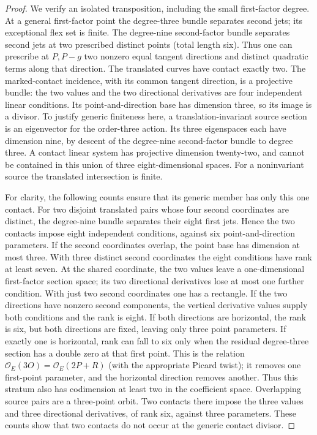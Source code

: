 \begin{proof}
We verify an isolated transposition, including the small
first-factor degree. At a general first-factor point the
degree-three bundle separates second jets; its exceptional
flex set is finite. The degree-nine second-factor bundle
separates second jets at two prescribed distinct points
(total length six). Thus one can prescribe at $P,P-g$
two nonzero equal tangent directions and distinct quadratic
terms along that direction. The translated curves have
contact exactly two. The marked-contact incidence, with its
common tangent direction, is a projective bundle: the two
values and the two directional derivatives are four
independent linear conditions. Its point-and-direction base
has dimension three, so its image is a divisor. To justify
generic finiteness here, a translation-invariant source section
is an eigenvector for the order-three action. Its three
eigenspaces each have dimension nine, by descent of the
degree-nine second-factor bundle to degree three. A contact
linear system has projective dimension twenty-two, and cannot
be contained in this union of three eight-dimensional spaces.
For a noninvariant source the translated intersection is finite.

For clarity, the following counts ensure that its generic
member has only this one contact. For two disjoint translated
pairs whose four second coordinates are distinct, the
degree-nine bundle separates their eight first jets. Hence
the two contacts impose eight independent conditions, against
six point-and-direction parameters. If the second coordinates
overlap, the point base has dimension at most three. With three
distinct second coordinates the eight conditions have rank
at least seven. At the shared coordinate, the two values
leave a one-dimensional first-factor section space; its two
directional derivatives lose at most one further condition.
With just two second coordinates one has a rectangle. If the
two directions have nonzero second components, the vertical
derivative values supply both conditions and the rank is eight.
If both directions are horizontal, the rank is six, but both
directions are fixed, leaving only three point parameters.
If exactly one is horizontal, rank can fall to six only when
the residual degree-three section has a double zero at that
first point. This is the relation
$\mathcal O_E(3O)=\mathcal O_E(2P+R)$ (with the appropriate
Picard twist); it removes one first-point parameter, and the
horizontal direction removes another. Thus this stratum also
has codimension at least two in the coefficient space.
Overlapping source pairs are a three-point orbit. Two contacts
there impose the three values and three directional derivatives,
of rank six, against three parameters. These counts show that
two contacts do not occur at the generic contact divisor.


\end{proof}
